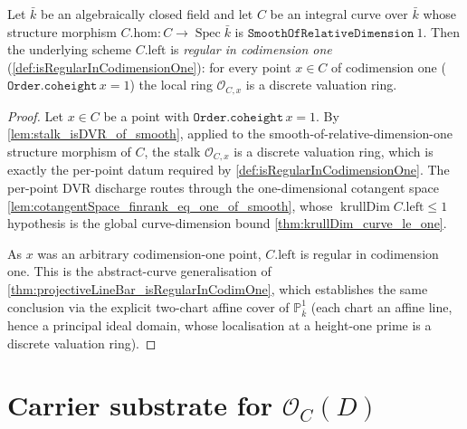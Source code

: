 \begin{theorem}

  \label{thm:smooth_isRegularInCodimOne}
  Let \(\bar k\) be an algebraically closed field and let \(C\) be an
  integral curve over
  \(\bar k\) whose structure morphism
  \(C.\mathrm{hom} : C \to \operatorname{Spec} \bar k\) is
  \(\texttt{SmoothOfRelativeDimension}\ 1\). Then the underlying scheme
  \(C.\mathrm{left}\) is \emph{regular in codimension one}
  (\cref{def:isRegularInCodimensionOne}): for every point \(x \in C\) of
  codimension one (\(\texttt{Order.coheight}\,x = 1\)) the local ring
  \(\mathcal O_{C, x}\) is a discrete valuation ring.
\end{theorem}

\begin{proof}
  Let \(x \in C\) be a point with \(\texttt{Order.coheight}\,x = 1\). By
  \cref{lem:stalk_isDVR_of_smooth}, applied to the
  smooth-of-relative-dimension-one structure morphism of \(C\), the stalk
  \(\mathcal O_{C, x}\) is a discrete valuation ring, which is exactly the
  per-point datum required by \cref{def:isRegularInCodimensionOne}. The
  per-point DVR discharge routes through the one-dimensional cotangent space
  \cref{lem:cotangentSpace_finrank_eq_one_of_smooth}, whose
  \(\operatorname{krullDim} C.\mathrm{left} \le 1\) hypothesis is the global
  curve-dimension bound \cref{thm:krullDim_curve_le_one}.

  As \(x\) was an arbitrary codimension-one point, \(C.\mathrm{left}\) is
  regular in codimension one. This is the abstract-curve generalisation of
  \cref{thm:projectiveLineBar_isRegularInCodimOne}, which establishes the same
  conclusion via the explicit two-chart affine cover of \(\mathbb P^1_{\bar k}\)
  (each chart an affine line, hence a principal ideal domain, whose localisation
  at a height-one prime is a discrete valuation ring).
\end{proof}

\section{Carrier substrate for \(\mathcal O_C(D)\)}

